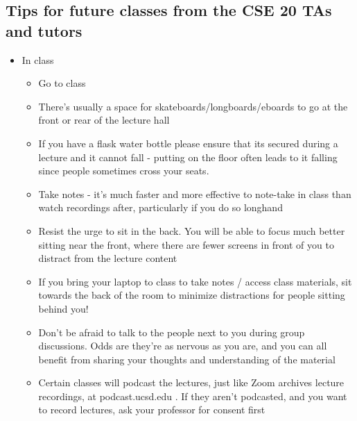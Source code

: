 \subsection*{Tips for future classes from the CSE 20 TAs and tutors}
\begin{itemize}
\item In class
\begin{itemize}
\item Go to class
\item There's usually a space for skateboards/longboards/eboards to go at the front or rear of the lecture hall 
\item If you have a flask water bottle please ensure that its secured during a lecture and it cannot fall - putting on the floor often leads to it falling since people sometimes cross your seats.
\item Take notes - it's much faster and more effective to note-take in class than watch recordings after, particularly if you do so longhand
\item Resist the urge to sit in the back. You will be able to focus much better sitting near the front, where there are fewer screens in front of you to distract from the lecture content
\item If you bring your laptop to class to take notes / access class materials, sit towards the back of the room to minimize distractions for people sitting behind you!
\item Don't be afraid to talk to the people next to you during group discussions. Odds are they're as nervous as you are, and you can all benefit from sharing your thoughts and understanding of the material 
\item Certain classes will podcast the lectures, just like Zoom archives lecture recordings, at podcast.ucsd.edu . If they aren't podcasted, and you want to record lectures, ask your professor for consent first

\end{itemize}
\end{itemize}
